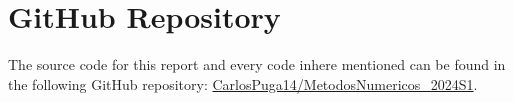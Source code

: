 \section{GitHub Repository}\label{sec:github}
 The source code for this report and every code inhere mentioned can be found in the following GitHub repository: \href{https://github.com/CarlosPuga14/MetodosNumericos_2024S1}{CarlosPuga14/MetodosNumericos\_2024S1}.
